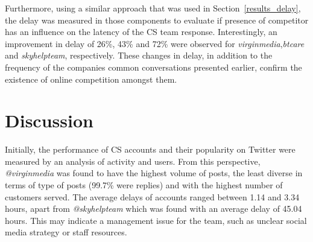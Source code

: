 \documentclass[sigconf]{acmart}
\begin{document}
{Furthermore, using a similar approach that was used in
Section~\ref{results_delay}, the delay was measured in those
components to evaluate if presence of competitor has an influence on
the latency of the CS team response. Interestingly, an improvement in
delay of 26\%, 43\% and 72\% were observed for
{\emph{virginmedia}},{\emph{btcare}} and {\emph{skyhelpteam}},
respectively. These changes in delay, in addition to the frequency of
the companies common conversations presented earlier, confirm the
existence of online competition amongst them.






\section{Discussion}\label{discussion}

Initially, the performance of CS accounts and their popularity on
Twitter were measured by an analysis of activity and users. From this
perspective, {\emph{@virginmedia}} was found to have the highest
volume of posts, the least diverse in terms of type of posts (99.7\%
were replies) and with the highest number of customers served. The
average delays of accounts ranged between 1.14 and 3.34 hours, apart
from {\emph{@skyhelpteam}} which was found with an average delay of
45.04 hours. This may indicate a management issue for the team, such
as unclear social media strategy or staff resources.

}
\end{document}
